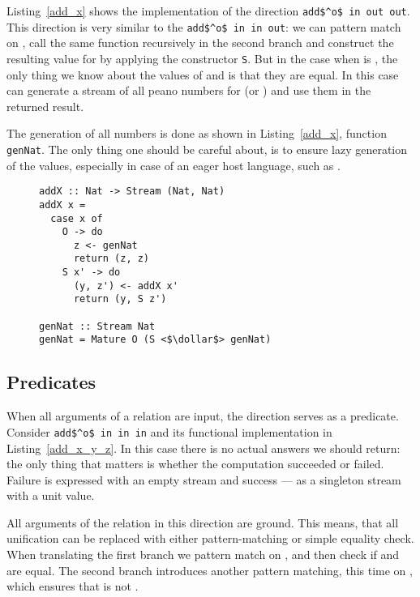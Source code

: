 Listing~\ref{add_x} shows the implementation of the direction \lstinline{add$^o$ in out out}.
This direction is very similar to the \lstinline{add$^o$ in in out}: we can pattern match on \x, call the same function recursively in the second \conde branch and construct the resulting value for \z by applying the constructor \lstinline{S}.
But in the case when \x is \zero, the only thing we know about the values of \y and \z is that they are equal.
In this case can generate a stream of all peano numbers for \z (or \y) and use them in the returned result.

The generation of all numbers is done as shown in Listing~\ref{add_x}, function \lstinline{genNat}.
The only thing one should be careful about, is to ensure lazy generation of the values, especially in case of an eager host language, such as \ocaml.

\begin{figure}[!t]
  \centering
  \begin{minipage}{\columnwidth}
    \begin{lstlisting}[label={add_x}, caption={Function for \lstinline{addo in out out} direction}, captionpos=b, frame=tb]
addX :: Nat -> Stream (Nat, Nat)
addX x =
  case x of
    O -> do
      z <- genNat
      return (z, z)
    S x' -> do
      (y, z') <- addX x'
      return (y, S z')

genNat :: Stream Nat
genNat = Mature O (S <$\dollar$> genNat)
    \end{lstlisting}
  \end{minipage}
\end{figure}

\subsection{Predicates}

When all arguments of a relation are input, the direction serves as a predicate.
Consider \lstinline{add$^o$ in in in} and its functional implementation in Listing~\ref{add_x_y_z}.
In this case there is no actual answers we should return: the only thing that matters is whether the computation succeeded or failed.
Failure is expressed with an empty stream and success --- as a singleton stream with a unit value.

All arguments of the relation in this direction are ground.
This means, that all unification can be replaced with either pattern-matching or simple equality check.
When translating the first \conde branch we pattern match on \x, and then check if \y and \z are equal.
The second \conde branch introduces another pattern matching, this time on \z, which ensures that \z is not \zero.

